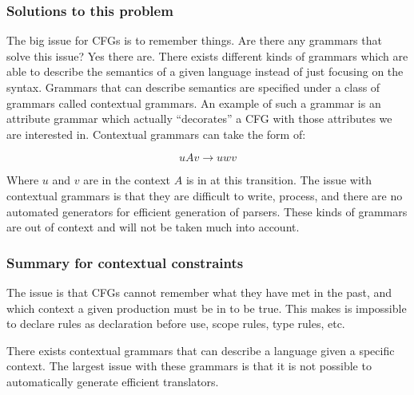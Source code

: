 \subsubsection*{Solutions to this problem}
The big issue for CFGs is to remember things. Are there any grammars
that solve this issue? Yes there are. There exists different kinds of
grammars which are able to describe the semantics of a given language
instead of just focusing on the syntax. Grammars that can describe
semantics are specified under a class of grammars called contextual
grammars\cite{plpp}. An example of such a grammar is an attribute
grammar which actually ``decorates'' a CFG with those attributes we are
interested in\cite{attrgrammar}.
Contextual grammars can take the form of:

\[
  uAv \rightarrow uwv
\]

Where $u$ and $v$ are in the context $A$ is in at this transition. The
issue with contextual grammars is that they are difficult to write,
process, and there are no automated generators for efficient generation
of parsers. These kinds of grammars are out of context and will not be
taken much into account\cite{attrgrammar}.

\subsubsection*{Summary for contextual constraints}
The issue is that CFGs cannot remember what they have met in the past, and
which context a given production must be in to be true. This makes is impossible
to declare rules as declaration before use, scope rules, type rules, etc.

There exists contextual grammars that can describe a language given a specific
context. The largest issue with these grammars is that it is not possible to
automatically generate efficient translators.
